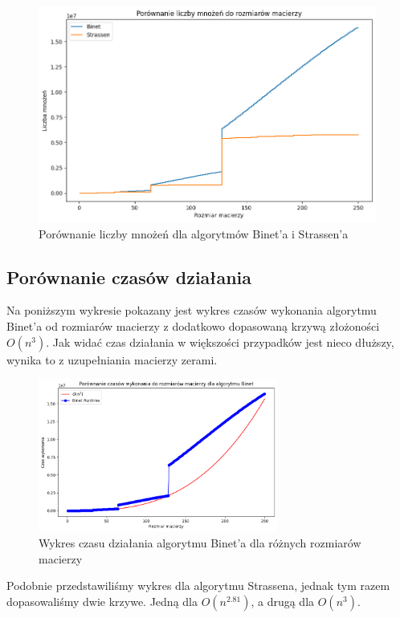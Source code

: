 \documentclass{article}
\begin{document}
\begin{figure}[H]
  \centering
    \includegraphics[width=0.99\textwidth]{images/binet_strassen_mult.png}
  \caption{Porównanie liczby mnożeń dla algorytmów Binet'a i Strassen'a}
\end{figure}

\subsection{Porównanie czasów działania}

Na poniższym wykresie pokazany jest wykres czasów wykonania algorytmu Binet'a od rozmiarów macierzy z dodatkowo dopasowaną krzywą złożoności \(O(n^3)\). Jak widać czas działania w większości przypadków jest nieco dłuższy, wynika to z uzupełniania macierzy zerami.

\begin{figure}[H]
  \centering
    \includegraphics[width=0.7\textwidth]{images/binet_runtime.png}
  \caption{Wykres czasu działania algorytmu Binet'a dla różnych rozmiarów macierzy}
\end{figure}

\noindent
Podobnie przedstawiliśmy wykres dla algorytmu Strassena, jednak tym razem dopasowaliśmy dwie krzywe. Jedną dla \(O(n^{2.81})\), a drugą dla \(O(n^3)\).
\end{document}
